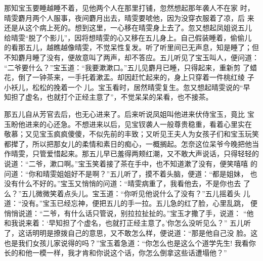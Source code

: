 那知宝玉要睡越睡不着，见他两个人在那里打铺，忽然想起那年袭人不在家
时，晴雯麝月两个人服事，夜间麝月出去，晴雯要唬他，因为没穿衣服着了凉，后
来还是从这个病上死的。想到这里，一心移在晴雯身上去了。忽又想起凤姐说五儿
给晴雯“脱了个影儿”，因将想晴雯的心又移在五儿身上。自己假装睡着，偷偷儿
的看那五儿，越瞧越像晴雯，不觉呆性复发。听了听里间已无声息，知是睡了；但
不知麝月睡了没有，便故意叫了两声，却不答应。五儿听见了宝玉叫人，便问道：
“二爷要什么？”宝玉道：“我要漱漱口。”五儿见麝月已睡，只得起来，重新剪
了蜡花，倒了一钟茶来，一手托着漱盂。却因赶忙起来的，身上只穿着一件桃红绫
子小袄儿，松松的挽着一个儿。宝玉看时，居然晴雯复生。忽又想起晴雯说的“早
知担了虚名，也就打个正经主意了”，不觉呆呆的呆看，也不接茶。

那五儿自从芳官去后，也无心进来了。后来听说凤姐叫他进来伏侍宝玉，竟比
宝玉盼他进来的心还急。不想进来以后，见宝钗袭人一般尊贵稳重，看着心里实在
敬慕；又见宝玉疯疯傻傻，不似先前的丰致；又听见王夫人为女孩子们和宝玉玩笑
都撵了，所以把那女儿的柔情和素日的痴心，一概搁起。怎奈这位呆爷今晚把他当
作晴雯，只管爱惜起来。那五儿早已羞得两颊红潮，又不敢大声说话，只得轻轻的
说道：“二爷，漱口啊。”宝玉笑着接了茶在手中，也不知道漱了没有，便笑嘻嘻
的问道：“你和晴雯姐姐好不是啊？”五儿听了，摸不着头脑，便道：“都是姐妹，
也没有什么不好的。”宝玉又悄悄的问道：“晴雯病重了，我看他去，不是你也去
了么？”五儿微微笑着点头儿。宝玉道：“你听见他说什么了没有？”五儿摇着头
儿道：“没有。”宝玉已经忘神，便把五儿的手一拉。五儿急的红了脸，心里乱跳，
便悄悄说道：“二爷，有什么话只管说，别拉拉扯扯的。”宝玉才撒了手，说道：
“他和我说来着：‘早知担了个虚名，也就打正经主意了。’你怎么没听见么？”
五儿听了，这话明明是撩拨自己的意思，又不敢怎么样，便说道：“那是他自己没
脸。这也是我们女孩儿家说得的吗？”宝玉着急道：“你怎么也是这么个道学先生!
我看你长的和他一模一样，我才肯和你说这个话，你怎么倒拿这些话遭塌他？”

